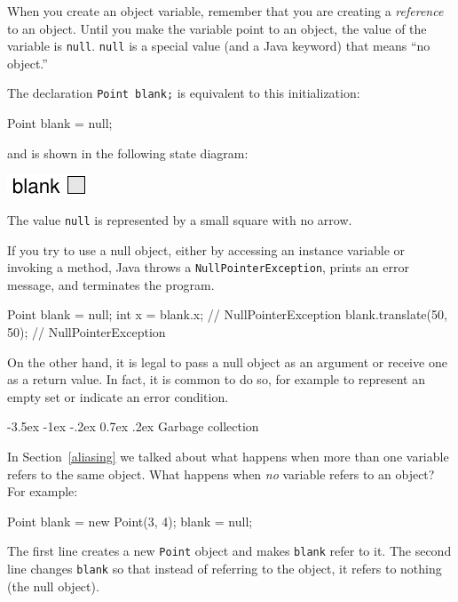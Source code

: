 \documentclass[12pt]{book}
\makeatletter
\renewcommand{\section}{\@startsection {section}{1}{\z@}%
    {-3.5ex \@plus -1ex \@minus -.2ex}%
    {0.7ex \@plus.2ex}%
    {\normalfont\Large\bfseries}}
\theoremstyle{exercise}
\newcommand{\java}[1]{\lstinline{#1}} %
\makeatother
\begin{document}
When you create an object variable, remember that you are creating a {\em reference} to an object.
Until you make the variable point to an object, the value of the variable is \java{null}.
\java{null} is a special value (and a Java keyword) that means ``no object.''

The declaration \java{Point blank;} is equivalent to this initialization:

\begin{code}
    Point blank = null;
\end{code}

and is shown in the following state diagram:

\includegraphics{figs/reference2.pdf}

The value \java{null} is represented by a small square with no arrow.


If you try to use a null object, either by accessing an instance variable or invoking a method, Java throws a \java{NullPointerException}, prints an error message, and terminates the program.

\begin{code}
    Point blank = null;
    int x = blank.x;              // NullPointerException
    blank.translate(50, 50);      // NullPointerException
\end{code}

On the other hand, it is legal to pass a null object as an argument or receive one as a return value.
In fact, it is common to do so, for example to represent an empty set or indicate an error condition.


\section{Garbage collection}

In Section~\ref{aliasing} we talked about what happens when more than one variable refers to the same object.
What happens when {\em no} variable refers to an object?
For example:

\begin{code}
    Point blank = new Point(3, 4);
    blank = null;
\end{code}

The first line creates a new \java{Point} object and makes \java{blank} refer to it.
The second line changes \java{blank} so that instead of referring to the object, it refers to nothing (the null object).
\end{document}
